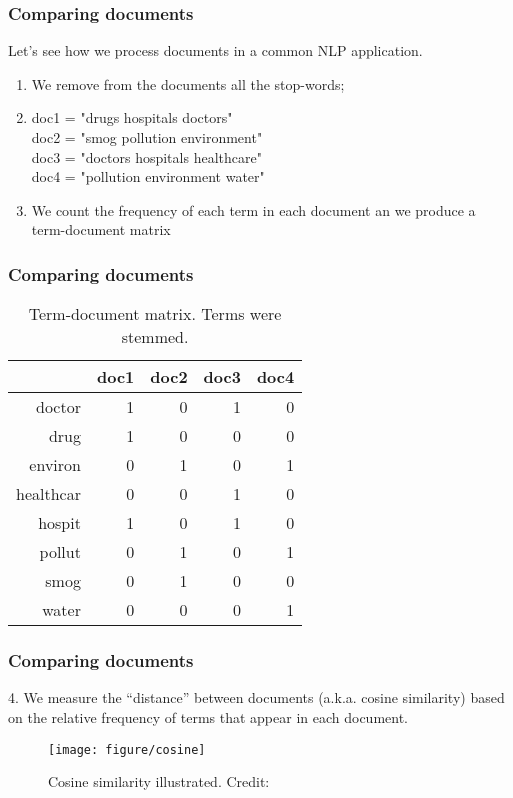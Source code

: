 \documentclass[serif, aspectratio=169]{beamer}
\begin{document}
\begin{frame}[<+->]
\frametitle{Comparing documents}

Let's see how we process documents in a common NLP application.

\begin{enumerate}

\item<1-> We remove from the documents all the stop-words;

\item<2-> doc1 = "drugs hospitals doctors" \\
doc2 = "smog pollution environment" \\
doc3 = "doctors hospitals healthcare" \\
doc4 = "pollution environment water" \\

\item<3-> We count the frequency of each term in each document an we produce a term-document matrix

\end{enumerate}

\end{frame}

\begin{frame}[<+->]
\frametitle{Comparing documents}

\begin{table}[ht]
\centering
\begin{tabular}{rrrrr}
  \hline
 & doc1 & doc2 & doc3 & doc4 \\ 
  \hline
doctor & 1 & 0 & 1 & 0 \\ 
  drug & 1 & 0 & 0 & 0 \\ 
  environ & 0 & 1 & 0 & 1 \\ 
  healthcar & 0 & 0 & 1 & 0 \\ 
  hospit & 1 & 0 & 1 & 0 \\ 
  pollut & 0 & 1 & 0 & 1 \\ 
  smog & 0 & 1 & 0 & 0 \\ 
  water & 0 & 0 & 0 & 1 \\ 
   \hline
\end{tabular}
\caption{Term-document matrix. Terms were stemmed.} 
\label{tab:example1-tf-table}
\end{table}

\end{frame}

\begin{frame}[<+->]
\frametitle{Comparing documents}


4. We measure the ``distance'' between documents (a.k.a. cosine similarity) based on the relative frequency of terms that appear in each document.

\begin{figure}
    \texttt{[image: figure/cosine]}
\caption{Cosine similarity illustrated. Credit: \autocite[112]{manning_introduction_2008}}
\end{figure}


\end{frame}
\end{document}
